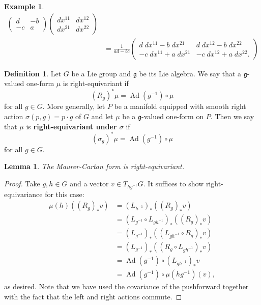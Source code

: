 \documentclass{book}
\newcommand{\fr}{\mathfrak}
\DeclareMathOperator{\Ad}{Ad}
\theoremstyle{plain}
\newtheorem{lem}[thm]{Lemma}
\theoremstyle{definition}
\newtheorem{defn}{Definition}
\newtheorem{exmp}{Example}
\theoremstyle{remark}
\begin{document}
\begin{exmp}
\begin{align*}
\begin{pmatrix}
            d&-b\\-c&a
        \end{pmatrix}\begin{pmatrix}
            dx^{11}&dx^{12}\\dx^{21}&dx^{22}
        \end{pmatrix}\\
        &=\frac{1}{ad-bc}\begin{pmatrix}
            d\;dx^{11}-b\;dx^{21}&d\;dx^{12}-b\;dx^{22}\\-c\;dx^{11}+a\;dx^{21}&-c\;dx^{12}+a\;dx^{22}.
        \end{pmatrix}
    \end{align*}
\end{exmp}

\begin{defn}
    Let $G$ be a Lie group and $\fr g$ be its Lie algebra. We say that a $\fr g$-valued one-form $\mu$ is right-equivariant if
    \[(R_g)^*\mu=\Ad(g^{-1})\circ \mu\]
    for all $g\in G$. More generally, let $P$ be a manifold equipped with smooth right action $\sigma(p,g)=p\cdot g$ of $G$ and let $\mu$ be a $\fr g$-valued one-form
    on $P$. Then we say that $\mu$ is \textbf{right-equivariant under $\sigma$} if
    \[(\sigma_g)^*\mu=\Ad(g^{-1})\circ \mu\]
    for all $g\in G$.
\end{defn}

\begin{lem}
    The Maurer-Cartan form is right-equivariant.
\end{lem}
\begin{proof}
    Take $g,h\in G$ and a vector $v\in T_{hg^{-1}}G$. It suffices to show right-equivariance for this case:
    \begin{align*}
        \mu(h)\left( (R_g)_*v \right)&=(L_{h^{-1}})_*\left( (R_g)_*v \right)\\
        &=(L_{g^{-1}}\circ L_{gh^{-1}})_*\left( (R_g)_*v \right)\\
        &=(L_{g^{-1}})_*\left( (L_{gh^{-1}}\circ R_g)_*v \right)\\
        &=(L_{g^{-1}})_*\left( (R_g\circ L_{gh^{-1}})_*v\right)\\
        &=\Ad(g^{-1})\circ (L_{gh^{-1}})_*v\\
        &=\Ad(g^{-1})\circ \mu(hg^{-1})(v),
    \end{align*}
    as desired. Note that we have used the covariance of the pushforward together with the fact that the left and right actions
    commute.
\end{proof}
\end{document}
